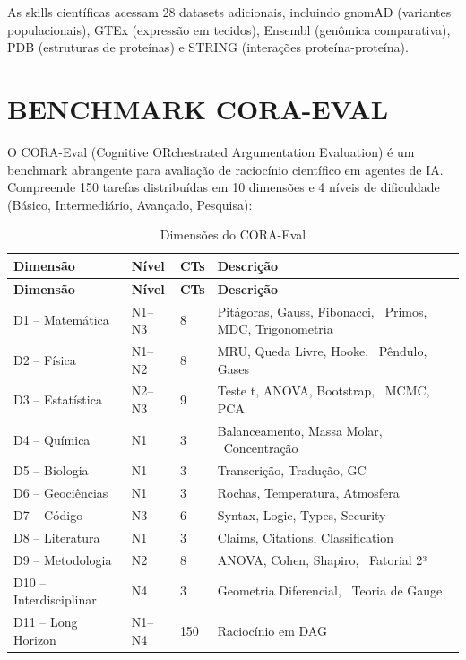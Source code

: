 \documentclass[
  brazil,
  sumario=tradicional,
  10pt
]{abntex2}
\begin{document}
As skills científicas acessam 28 datasets adicionais, incluindo
gnomAD (variantes populacionais), GTEx (expressão em tecidos),
Ensembl (genômica comparativa), PDB (estruturas de proteínas) e
STRING (interações proteína-proteína).

\section{BENCHMARK CORA-EVAL}
\label{sec:coraeval}

O CORA-Eval (Cognitive ORchestrated Argumentation Evaluation) é um
benchmark abrangente para avaliação de raciocínio científico em
agentes de IA. Compreende 150 tarefas distribuídas em 10 dimensões
e 4 níveis de dificuldade (Básico, Intermediário, Avançado,
Pesquisa):

\begin{longtable}{p{3cm}p{2cm}p{2cm}p{5cm}}
  \caption{Dimensões do CORA-Eval}
  \label{tab:coraeval}\\
  \toprule
  \textbf{Dimensão} & \textbf{Nível} & \textbf{CTs} & \textbf{Descrição} \\
  \midrule
  \endfirsthead
  \toprule
  \textbf{Dimensão} & \textbf{Nível} & \textbf{CTs} & \textbf{Descrição} \\
  \midrule
  \endhead
  \bottomrule
  \endfoot
  D1 -- Matemática     & N1--N3 & 8  & Pitágoras, Gauss, Fibonacci, \
                                      Primos, MDC, Trigonometria \\
  D2 -- Física         & N1--N2 & 8  & MRU, Queda Livre, Hooke, \
                                      Pêndulo, Gases \\
  D3 -- Estatística    & N2--N3 & 9  & Teste t, ANOVA, Bootstrap, \
                                      MCMC, PCA \\
  D4 -- Química        & N1     & 3  & Balanceamento, Massa Molar, \
                                      Concentração \\
  D5 -- Biologia       & N1     & 3  & Transcrição, Tradução, GC \\
  D6 -- Geociências    & N1     & 3  & Rochas, Temperatura, Atmosfera \\
  D7 -- Código         & N3     & 6  & Syntax, Logic, Types, Security \\
  D8 -- Literatura     & N1     & 3  & Claims, Citations, Classification \\
  D9 -- Metodologia    & N2     & 8  & ANOVA, Cohen, Shapiro, \
                                      Fatorial 2³ \\
  D10 -- Interdisciplinar & N4 & 3  & Geometria Diferencial, \
                                      Teoria de Gauge \\
  D11 -- Long Horizon  & N1--N4 & 150 & Raciocínio em DAG \\
\end{longtable}
\end{document}
